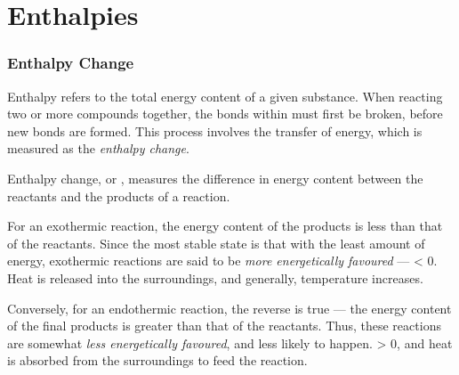 
\pagebreak
\part{Enthalpies}

\section{Enthalpy Change}

	Enthalpy refers to the total energy content of a given substance. When reacting two or more compounds together, the bonds within
	must first be broken, before new bonds are formed. This process involves the transfer of energy, which is measured as the
	\textit{enthalpy change}.

	Enthalpy change, or \enth{}, measures the difference in energy content between the reactants and the products of a reaction.

	For an exothermic reaction, the energy content of the products is less than that of the reactants. Since the most stable state
	is that with the least amount of energy, exothermic reactions are said to be \textit{more energetically favoured} --- \enth{} < 0.
	Heat is released into the surroundings, and generally, temperature increases.


	\pagebreak
	Conversely, for an endothermic reaction, the reverse is true --- the energy content of the final products is greater than that
	of the reactants. Thus, these reactions are somewhat \textit{less energetically favoured}, and less likely to happen.
	\enth{} > 0, and heat is absorbed from the surroundings to feed the reaction.


